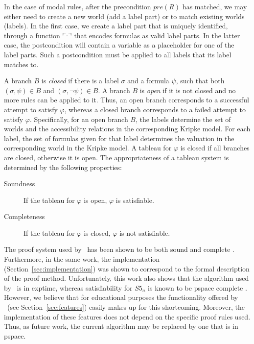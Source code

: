In the case of modal rules, after the precondition $pre(R)$ has matched, we
may either need to create a new world (add a label part) or to match existing
worlds (labels). In the first case, we create a label part that is uniquely
identified, through a function $\ulcorner\cdot\urcorner$ that encodes formulas as valid
label parts. In the latter case, the postcondition will contain a variable as
a placeholder for one of the label parts. Such a postcondition must be applied
to all labels that its label matches to.

A branch $B$ is {\em closed} if there is a label $\sigma$ and a formula
$\psi$, such that both $(\sigma, \psi) \in B$ and $(\sigma, \neg \psi)
\in B$. A branch $B$ is {\em open} if it is not closed and no more rules can be
applied to it. Thus, an open branch corresponds to a successful attempt to
satisfy $\varphi$, whereas a closed branch corresponds to a failed attempt to
satisfy $\varphi$. 
Specifically, for an open branch $B$, the labels determine the set of worlds
and the accessibility relations in the corresponding Kripke model. For each
label, the set of formulas given for that label determines the valuation in the
corresponding world in the Kripke model.
A tableau for $\varphi$ is closed if all branches are
closed, otherwise it is open. The appropriateness of a tableau system is
determined by the following properties:
\begin{description}
\item[Soundness] If the tableau for $\varphi$ is open, $\varphi$ is satisfiable.
\item[Completeness] If the tableau for $\varphi$ is closed, $\varphi$ is not
satisfiable.
\end{description}



The proof system used by \oops\ has been shown to be both sound and complete
\citep{valkenhoef2008}.  Furthermore, in the same work, the implementation
(Section~\ref{sec:implementation}) was
shown to correspond to the formal description of the proof method.
Unfortunately, this work also shows that the algorithm used by \oops\ is in
{\sc exptime}, whereas satisfiability for $S5_n$ is known to be {\sc pspace}
complete \citep{halpern1992}.
However, we believe that for educational purposes the functionality  offered
by \oops\ (see Section~\ref{sec:features}) easily makes up for this
shortcoming. Moreover, the implementation of these features does not depend on
the specific proof rules used. Thus, as future work, the current algorithm may
be replaced by one that is in {\sc pspace}.



